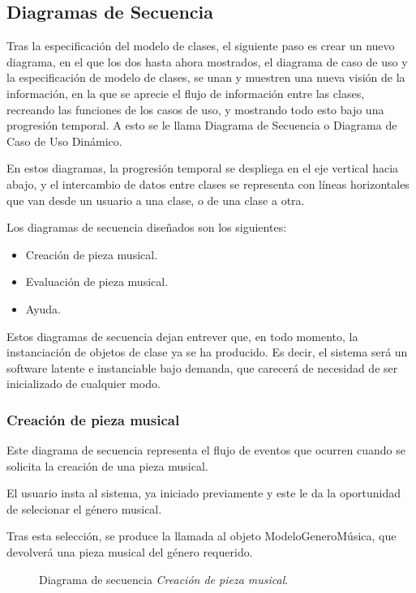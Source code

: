 
\subsection{Diagramas de Secuencia}

Tras la especificación del modelo de clases, el siguiente paso es crear un nuevo diagrama, en el que los dos hasta ahora mostrados, el diagrama de caso de uso y la especificación de modelo de clases, se unan y muestren una nueva visión de la información, en la que se aprecie el flujo de información entre las clases, recreando las funciones de los casos de uso, y mostrando todo esto bajo una progresión temporal. A esto se le llama Diagrama de Secuencia o Diagrama de Caso de Uso Dinámico.

En estos diagramas, la progresión temporal se despliega en el eje vertical hacia abajo, y el intercambio de datos entre clases se representa con líneas horizontales que van desde un usuario a una clase, o de una clase a otra.

Los diagramas de secuencia diseñados son los siguientes:

\begin{itemize}
    \item Creación de pieza musical.
    \item Evaluación de pieza musical.
    \item Ayuda.
\end{itemize}

Estos diagramas de secuencia dejan entrever que, en todo momento, la instanciación de objetos de clase ya se ha producido. Es decir, el sistema será un software latente e instanciable bajo demanda, que carecerá de necesidad de ser inicializado de cualquier modo.

\newpage
\subsubsection{Creación de pieza musical}

Este diagrama de secuencia representa el flujo de eventos que ocurren cuando se solicita la creación de una pieza musical.

El usuario insta al sistema, ya iniciado previamente y este le da la oportunidad de selecionar el género musical.

Tras esta selección, se produce la llamada al objeto ModeloGeneroMúsica, que devolverá una pieza musical del género requerido.

\begin{figure}[H]
  \centering
  
  \caption{Diagrama de secuencia \emph{Creación de pieza musical}.}
\end{figure}

